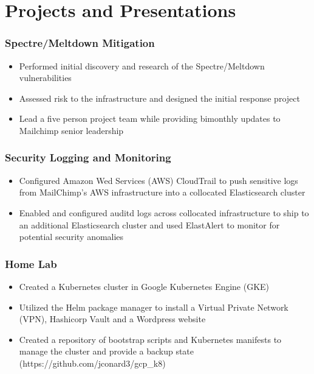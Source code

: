 \documentclass[letterpaper]{article}
\begin{document}
\section*{Projects and Presentations}
\subsubsection*{Spectre/Meltdown Mitigation}
\begin{itemize}[noitemsep]
	\item Performed initial discovery and research of the Spectre/Meltdown vulnerabilities
	\item Assessed risk to the infrastructure and designed the initial response project
	\item Lead a five person project team while providing bimonthly updates to Mailchimp senior leadership
\end{itemize}
\subsubsection*{Security Logging and Monitoring}
\begin{itemize}[noitemsep]
	\item Configured Amazon Wed Services (AWS) CloudTrail to push sensitive logs from MailChimp's AWS infrastructure into a collocated Elasticsearch cluster
	\item Enabled and configured auditd logs across collocated infrastructure to ship to an additional Elasticsearch cluster and used ElastAlert to monitor for potential security anomalies
\end{itemize}
\subsubsection*{Home Lab}
\begin{itemize}[noitemsep]
	\item Created a Kubernetes cluster in Google Kubernetes Engine (GKE)
	\item Utilized the Helm package manager to install a Virtual Private Network (VPN), Hashicorp Vault and a Wordpress website
	\item Created a repository of bootstrap scripts and Kubernetes manifests to manage the cluster and provide a backup state (https://github.com/jconard3/gcp\_k8)
\end{itemize}
\end{document}

